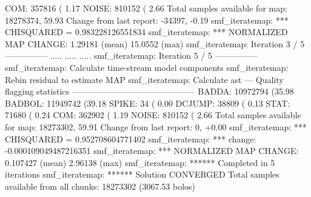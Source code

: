 \begin{terminalv}
   COM:     357816 ( 1.17%
 NOISE:     810152 ( 2.66%
Total samples available for map:   18278374, 59.93%
     Change from last report:     -34397, -0.19%
smf_iteratemap: *** CHISQUARED = 0.983228126551834
smf_iteratemap: *** NORMALIZED MAP CHANGE: 1.29181 (mean) 15.0552 (max)
smf_iteratemap: Iteration 3 / 5 ---------------
.....
.....
.....
smf_iteratemap: Iteration 5 / 5 ---------------
smf_iteratemap: Calculate time-stream model components
smf_iteratemap: Rebin residual to estimate MAP
smf_iteratemap: Calculate ast
--- Quality flagging statistics --------------------------------------------
 BADDA:   10972794 (35.98%
BADBOL:   11949742 (39.18%
 SPIKE:         34 ( 0.00%
DCJUMP:      38809 ( 0.13%
  STAT:      71680 ( 0.24%
   COM:     362902 ( 1.19%
 NOISE:     810152 ( 2.66%
Total samples available for map:   18273302, 59.91%
     Change from last report:          0, +0.00%
smf_iteratemap: *** CHISQUARED = 0.952708604771402
smf_iteratemap: *** change: -0.000109049487216351
smf_iteratemap: *** NORMALIZED MAP CHANGE: 0.107427 (mean) 2.96138 (max)
smf_iteratemap: ****** Completed in 5 iterations
smf_iteratemap: ****** Solution CONVERGED
Total samples available from all chunks: 18273302 (3067.53 bolos)
\end{terminalv}




